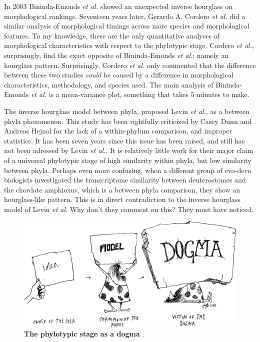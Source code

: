 In 2003 Bininda-Emonds \textit{et al.} showed an unexpected inverse hourglass on morphological rankings\cite{OlafRP2003}. Seventeen years later, Gerardo A. Cordero \textit{et al.} did a similar analysis of morphological timings across more species and morphological features\cite{Cordero2020}. To my knowledge, these are the only quantitative analyses of morphological characteristics with respect to the phylotypic stage. Cordero \textit{et al.}, surprisingly, find the exact opposite of Bininda-Emonds \textit{et al.}; namely an hourglass pattern. Surprisingly, Cordero \textit{et al.} only commented that the difference between these two studies \textit{could} be caused by a difference in morphological characteristics, methodology, and species used. The main analysis of Bininda-Emonds \textit{et al.} is a mean-variance plot, something that takes 5 minutes to make.

The inverse hourglass model between phyla, proposed Levin \textit{et al.}, as a between phyla phenomenon\cite{Levin2016}. This study has been rightfully criticized by Casey Dunn and Andreas Hejnol for the lack of a within-phylum comparison\cite{hejnol2016}, and improper statistics\cite{Dunn2018}. It has been seven years since this issue has been raised, and still has not been adressed by Levin \textit{et al.}. It is relatively little work for their major claim of a universal phylotypic stage of high similarity within phyla, but low similarity between phyla. Perhaps even more confusing, when a different group of evo-devo biologists investigated the transcriptome similarity between deuterostomes and the chordate amphioxus, which is a between phyla comparison, they show an hourglass-like pattern\cite{PerezPosada2022}. This is in direct contradiction to the inverse hourglass model of Levin \textit{et al}. Why don't they comment on this? They must have noticed.

\begin{figure}[H]
    \includegraphics[width=\linewidth]{ch.discussion/imgs/dogma.png}
    \caption{\textbf{The phylotypic stage as a dogma} \cite{Caveman2000}.}
    \label{fig:dogma}
\end{figure}

